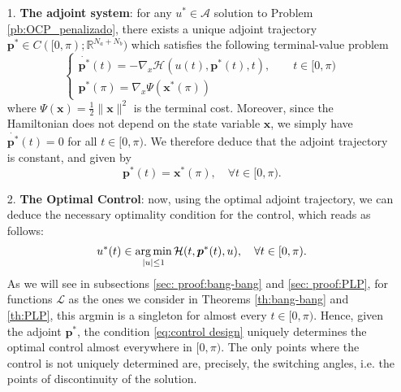 \documentclass[twocolumn]{autart}    %
\begin{document}
\begin{itemize}
	\item[1.] \textbf{The adjoint system}: for any $u^\ast \in \mathcal{A}$ solution to Problem \ref{pb:OCP_penalizado}, there exists a unique adjoint trajectory $\bm{p}^\ast\in C([0,\pi); \mathbb{R}^{N_a+N_b})$ which satisfies the following terminal-value problem
	\begin{equation*}
		\begin{cases}
			\dot{\bm{p}^\ast}(t) = -\nabla_x \mathcal{H}(u(t),\bm{p}^\ast(t),t), \qquad t \in [0,\pi)
			\\[5pt]
			\bm{p}^\ast (\pi) = \nabla_x \Psi (\bm{x}^\ast (\pi))
		\end{cases}
	\end{equation*}
	where $\Psi (\bm{x}) = \frac{1}{2} \| \bm{x}\|^2$ is the terminal cost. Moreover, since the Hamiltonian does not depend on the state variable $\bm{x}$, we simply have $\dot{\bm{p}^\ast}(t) = 0$ for all $t \in [0,\pi)$. We therefore deduce that the adjoint trajectory is constant, and given by
	\begin{equation}\label{eq:adjoint constant}
		\bm{p}^\ast (t) = \bm{x}^\ast (\pi), \quad \forall t \in [0,\pi). 
	\end{equation}
	
	\item[2.] \textbf{The Optimal  Control}: now, using the optimal adjoint trajectory, we can deduce the necessary optimality condition for the control, which reads as follows:
	\begin{align}\label{eq:control design}
		u^* (t) \in \operatorname*{arg\,min}_{|u|\leq 1} \mathcal{H}(t,\bm{p}^*(t),u), \quad \forall t \in [0,\pi).
	\end{align}
	As we will see in subsections \ref{sec: proof:bang-bang} and \ref{sec: proof:PLP}, for functions $\mathcal{L}$ as the ones we consider in Theorems \ref{th:bang-bang} and \ref{th:PLP}, this argmin is a singleton for almost every $t\in [0,\pi)$.  
	Hence, given the adjoint $\bm{p}^\ast$,  the condition \eqref{eq:control design} uniquely determines the optimal control almost everywhere in $[0,\pi)$. The only points where the control is not uniquely determined are, precisely, the switching angles, i.e. the points of discontinuity of the solution.
\end{itemize}
\end{document}
